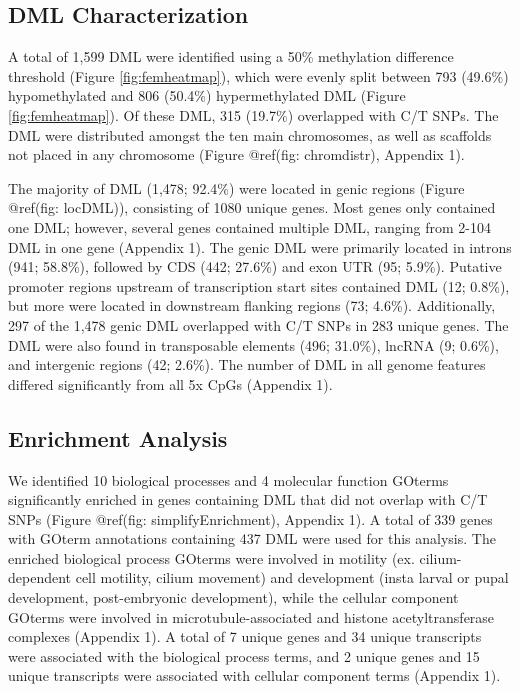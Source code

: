 \documentclass [11pt, proquest] {uwthesis}[2015/03/03]
\begin{document}
\hypertarget{dml-characterization-1}{%
\subsection{DML Characterization}\label{dml-characterization-1}}

A total of 1,599 DML were identified using a 50\% methylation difference threshold (Figure \ref{fig:femheatmap}), which were evenly split between 793 (49.6\%) hypomethylated and 806 (50.4\%) hypermethylated DML (Figure \ref{fig:femheatmap}). Of these DML, 315 (19.7\%) overlapped with C/T SNPs. The DML were distributed amongst the ten main chromosomes, as well as scaffolds not placed in any chromosome (Figure @ref(fig: chromdistr), Appendix 1).

The majority of DML (1,478; 92.4\%) were located in genic regions (Figure @ref(fig: locDML)), consisting of 1080 unique genes. Most genes only contained one DML; however, several genes contained multiple DML, ranging from 2-104 DML in one gene (Appendix 1). The genic DML were primarily located in introns (941; 58.8\%), followed by CDS (442; 27.6\%) and exon UTR (95; 5.9\%). Putative promoter regions upstream of transcription start sites contained DML (12; 0.8\%), but more were located in downstream flanking regions (73; 4.6\%). Additionally, 297 of the 1,478 genic DML overlapped with C/T SNPs in 283 unique genes. The DML were also found in transposable elements (496; 31.0\%), lncRNA (9; 0.6\%), and intergenic regions (42; 2.6\%). The number of DML in all genome features differed significantly from all 5x CpGs (Appendix 1).

\hypertarget{enrichment-analysis-1}{%
\subsection{Enrichment Analysis}\label{enrichment-analysis-1}}

We identified 10 biological processes and 4 molecular function GOterms significantly enriched in genes containing DML that did not overlap with C/T SNPs (Figure @ref(fig: simplifyEnrichment), Appendix 1). A total of 339 genes with GOterm annotations containing 437 DML were used for this analysis. The enriched biological process GOterms were involved in motility (ex. cilium-dependent cell motility, cilium movement) and development (insta larval or pupal development, post-embryonic development), while the cellular component GOterms were involved in microtubule-associated and histone acetyltransferase complexes (Appendix 1). A total of 7 unique genes and 34 unique transcripts were associated with the biological process terms, and 2 unique genes and 15 unique transcripts were associated with cellular component terms (Appendix 1).
\end{document}
